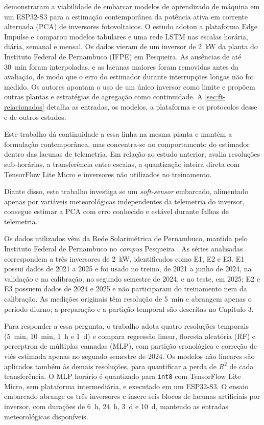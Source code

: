  demonstraram a viabilidade de embarcar modelos de
aprendizado de máquina em um ESP32-S3 para a estimação contemporânea da potência
ativa em corrente alternada (PCA) de inversores fotovoltaicos. O estudo adotou a
plataforma Edge Impulse e comparou modelos tabulares e uma rede LSTM nas escalas
horária, diária, semanal e mensal. Os dados vieram de um inversor de 2~kW da
planta do Instituto Federal de Pernambuco (IFPE) em Pesqueira. As ausências de
até 30~min foram interpoladas, e as lacunas maiores foram removidas antes da
avaliação, de modo que o erro do estimador durante interrupções longas não foi
medido. Os autores apontam o uso de um único inversor como limite e propõem
outras plantas e estratégias de agregação como continuidade.
A \cref{sec:ft-relacionados} detalha as entradas, os modelos, a plataforma e os
protocolos desse e de outros estudos.

Este trabalho dá continuidade a essa linha na mesma planta e mantém a formulação
contemporânea, mas concentra-se no comportamento do estimador dentro das lacunas
de telemetria. Em relação ao estudo anterior, avalia resoluções sub-horárias, a
transferência entre escalas, a quantização inteira direta com TensorFlow Lite
Micro e inversores não utilizados no treinamento.

Diante disso, este trabalho investiga se um \textit{soft-sensor} embarcado,
alimentado apenas por variáveis meteorológicas independentes da telemetria do
inversor, consegue estimar a PCA com erro conhecido e estável durante falhas de
telemetria.

Os dados utilizados vêm da Rede Solarimétrica de Pernambuco, mantida pelo
Instituto Federal de Pernambuco no \textit{campus} Pesqueira
\cite{pedrosafilho2022,pedrosafilho2025}. As séries analisadas correspondem a
três inversores de 2~kW, identificados como E1, E2 e E3. E1 possui dados de 2021
a 2025 e foi usado no treino, de 2021 a junho de 2024, na validação e na
calibração, no segundo semestre de 2024, e no teste, em 2025; E2 e E3 possuem
dados de 2024 e 2025 e não participaram do treinamento nem da calibração. As
medições originais têm resolução de 5~min e abrangem apenas o período diurno; a
preparação e a partição temporal são descritas no Capítulo 3.

Para responder a essa pergunta, o trabalho adota quatro resoluções temporais
(5~min, 10~min, 1~h e 1~d) e compara regressão linear, floresta aleatória (RF) e
perceptron de múltiplas camadas (MLP), com partição cronológica e correção de
viés estimada apenas no segundo semestre de 2024. Os modelos não lineares são
aplicados também às demais resoluções, para quantificar a perda de $R^2$ de cada
transferência. O MLP horário é quantizado para \texttt{int8} com TensorFlow Lite
Micro, sem plataforma intermediária, e executado em um ESP32-S3. O ensaio
embarcado abrange os três inversores e insere seis blocos de lacunas artificiais
por inversor, com durações de 6~h, 24~h, 3~d e 10~d, mantendo as entradas
meteorológicas disponíveis.

